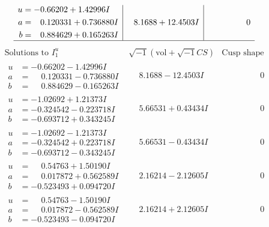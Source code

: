 \documentclass[1p]{elsarticle_modified}
\theoremstyle{definition}
\newcommand{\I}{\sqrt{-1}}
\begin{document}
$$\begin{array}{c|c|c}
\begin{aligned}
u &= -0.66202 + 1.42996 I \\
a &= \phantom{-}0.120331 + 0.736880 I \\
b &= \phantom{-}0.884629 + 0.165263 I\end{aligned}
 & \phantom{-}8.1688 + 12.4503 I & \phantom{-0.000000 } 0\\
 \hline 
 \end{array}$$\newpage$$\begin{array}{c|c|c}  
\text{Solutions to }I^u_{1}& \I (\text{vol} + \sqrt{-1}CS) & \text{Cusp shape}\\
 \hline 
\begin{aligned}
u &= -0.66202 - 1.42996 I \\
a &= \phantom{-}0.120331 - 0.736880 I \\
b &= \phantom{-}0.884629 - 0.165263 I\end{aligned}
 & \phantom{-}8.1688 - 12.4503 I & \phantom{-0.000000 } 0 \\ \hline\begin{aligned}
u &= -1.02692 + 1.21373 I \\
a &= -0.324542 - 0.223718 I \\
b &= -0.693712 + 0.343245 I\end{aligned}
 & \phantom{-}5.66531 + 0.43434 I & \phantom{-0.000000 } 0 \\ \hline\begin{aligned}
u &= -1.02692 - 1.21373 I \\
a &= -0.324542 + 0.223718 I \\
b &= -0.693712 - 0.343245 I\end{aligned}
 & \phantom{-}5.66531 - 0.43434 I & \phantom{-0.000000 } 0 \\ \hline\begin{aligned}
u &= \phantom{-}0.54763 + 1.50190 I \\
a &= \phantom{-}0.017872 + 0.562589 I \\
b &= -0.523493 + 0.094720 I\end{aligned}
 & \phantom{-}2.16214 - 2.12605 I & \phantom{-0.000000 } 0 \\ \hline\begin{aligned}
u &= \phantom{-}0.54763 - 1.50190 I \\
a &= \phantom{-}0.017872 - 0.562589 I \\
b &= -0.523493 - 0.094720 I\end{aligned}
 & \phantom{-}2.16214 + 2.12605 I & \phantom{-0.000000 } 0 \\ \hline\begin{aligned}

\end{aligned}
\end{array}$$
\end{document}
